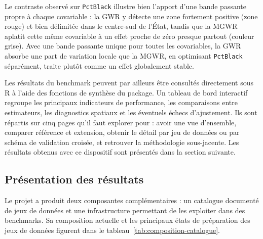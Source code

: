 \documentclass[11pt,a4paper]{article}
\begin{document}
Le contraste observé sur \texttt{PctBlack} illustre bien l'apport d'une bande passante propre à chaque covariable : la GWR y détecte une zone fortement positive (zone rouge) et bien délimitée dans le centre-sud de l'État, tandis que la MGWR aplatit cette même covariable à un effet proche de zéro presque partout (couleur grise). Avec une bande passante unique pour toutes les covariables, la GWR absorbe une part de variation locale que la MGWR, en optimisant \texttt{PctBlack} séparément, traite plutôt comme un effet globalement stable.

Les résultats du benchmark peuvent par ailleurs être consultés directement sous R à l'aide des fonctions de synthèse du package. Un tableau de bord interactif regroupe les principaux indicateurs de performance, les comparaisons entre estimateurs, les diagnostics spatiaux et les éventuels échecs d'ajustement. Ils sont répartis sur cinq pages qu'il faut explorer pour : avoir une vue d'ensemble, comparer référence et extension, obtenir le détail par jeu de données ou par schéma de validation croisée, et retrouver la méthodologie sous-jacente. Les résultats obtenus avec ce dispositif sont présentés dans la section suivante.

\subsection{Présentation des résultats}

Le projet a produit deux composantes complémentaires : un catalogue documenté de jeux de données et une infrastructure permettant de les exploiter dans des benchmarks. Sa composition actuelle et les principaux états de préparation des jeux de données figurent dans le tableau~\ref{tab:composition-catalogue}.
\end{document}
